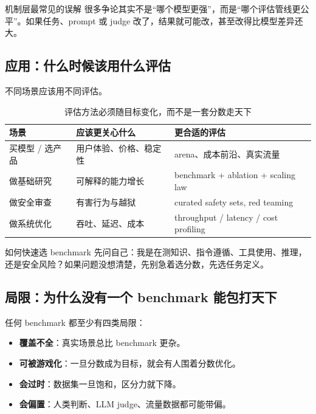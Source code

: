 \documentclass[a4paper]{article}
\begin{document}
\begin{warningbox}{机制层最常见的误解}
很多争论其实不是“哪个模型更强”，而是“哪个评估管线更公平”。如果任务、prompt 或 judge 改了，结果就可能改，甚至改得比模型差异还大。
\end{warningbox}

\subsection{应用：什么时候该用什么评估}

不同场景应该用不同评估。

\begin{table}[H]
\centering
\begin{tabular}{p{3.0cm}p{4.0cm}p{5.8cm}}
\toprule
\textbf{场景} & \textbf{应该更关心什么} & \textbf{更合适的评估} \\
\midrule
买模型 / 选产品 & 用户体验、价格、稳定性 & arena、成本前沿、真实流量 \\
做基础研究 & 可解释的能力增长 & benchmark + ablation + scaling law \\
做安全审查 & 有害行为与越狱 & curated safety sets, red teaming \\
做系统优化 & 吞吐、延迟、成本 & throughput / latency / cost profiling \\
\bottomrule
\end{tabular}
\caption{评估方法必须随目标变化，而不是一套分数走天下}
\end{table}

\begin{knowledgebox}{如何快速选 benchmark}
先问自己：我是在测知识、指令遵循、工具使用、推理，还是安全风险？如果问题没想清楚，先别急着选分数，先选任务定义。
\end{knowledgebox}

\subsection{局限：为什么没有一个 benchmark 能包打天下}

任何 benchmark 都至少有四类局限：
\begin{itemize}
    \item \textbf{覆盖不全}：真实场景总比 benchmark 更杂。
    \item \textbf{可被游戏化}：一旦分数成为目标，就会有人围着分数优化。
    \item \textbf{会过时}：数据集一旦饱和，区分力就下降。
    \item \textbf{会偏置}：人类判断、LLM judge、流量数据都可能带偏。
\end{itemize}
\end{document}
